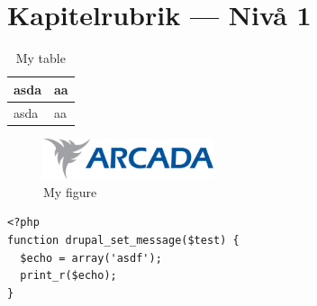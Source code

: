 \section{Kapitelrubrik --- Nivå 1}

\begin{table}[ht]
  \caption{My table}
  \begin{tabular}{ | l | p{2cm} | }
    \hline
    asda & aa \\ \hline
    asda & aa \\ \hline
  \end{tabular}
  \label{tab:myfirsttable}
\end{table}

\begin{figure}[ht]
  \includegraphics[width=5cm]{logo.pdf}
  \caption{My figure}
\end{figure}

\begin{lstlisting}
<?php
function drupal_set_message($test) {
  $echo = array('asdf');
  print_r($echo);
}
\end{lstlisting}

